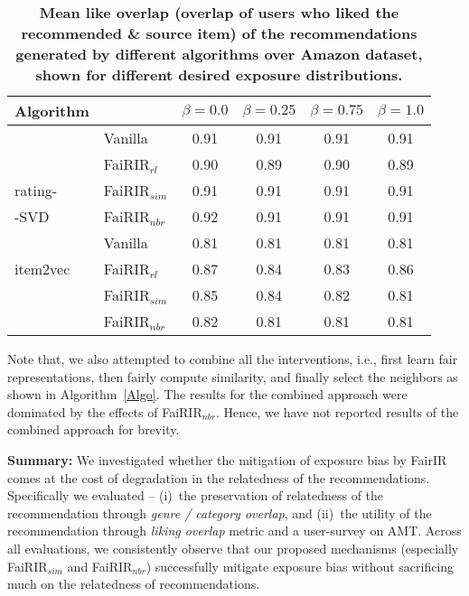\begin{table}[tb]
	\noindent
	\scriptsize
	\centering
	\begin{tabular}{|p{1cm}|p{1 cm}|c|c|c|c| }
		\hline
		Algorithm & & $\beta = 0.0$ & $\beta = 0.25$ & $\beta = 0.75$ & $\beta = 1.0$ \\
		\hline
		& Vanilla 		& 0.91 & 0.91 & 0.91 & 0.91 \\ \cline{2-6}
		& FaiRIR$_{rl}$ 	& 0.90 & 0.89 & 0.90 & 0.89\\ 
		\cline{2-6}
		rating-& FaiRIR$_{sim}$ 	& 0.91 & 0.91 & 0.91 & 0.91\\ \cline{2-6}
		-SVD & FaiRIR$_{nbr}$	& 0.92 & 0.91 & 0.91 & 0.91 \\
		\hline \hline
		& Vanilla 		& 0.81 & 0.81 & 0.81 & 0.81 \\ \cline{2-6}
		item2vec & FaiRIR$_{rl}$ 	& 0.87 & 0.84 & 0.83 & 0.86  \\ \cline{2-6}
		& FaiRIR$_{sim}$ & 0.85 & 0.84 & 0.82 & 0.81\\ \cline{2-6}
		& FaiRIR$_{nbr}$& 0.82 & 0.81 & 0.81 & 0.81 \\
		\hline
		
	\end{tabular}	
	\caption{{\bf Mean like overlap (overlap of users who liked the recommended \& source item) of the recommendations generated by different algorithms over Amazon dataset, shown for different desired exposure distributions.}}
	\label{Tab:UserSatisfaction-of-recs-Amazon}
	\vspace{-6 mm}
\end{table}


Note that, we also attempted to combine all the interventions, i.e., first learn fair representations, then fairly 
compute similarity, and finally select the neighbors as shown in Algorithm~\ref{Algo}. The results for the combined approach were dominated by the effects of FaiRIR$_{nbr}$.
Hence, we have not reported results of the combined approach for brevity.


\vspace{1mm}
\noindent
{\bf Summary:}  
We investigated whether the mitigation of exposure bias by FairIR comes at the cost of degradation in the relatedness of the recommendations.
Specifically we evaluated -- 
(i)~the preservation of relatedness of the recommendation through \textit{genre / category overlap}, and 
(ii)~the utility of the recommendation through {\it liking overlap} metric and a user-survey on AMT. 
Across all evaluations, we consistently observe that our proposed mechanisms (especially FaiRIR$_{sim}$ and FaiRIR$_{nbr}$) successfully mitigate exposure bias without sacrificing much on the relatedness of recommendations. 

